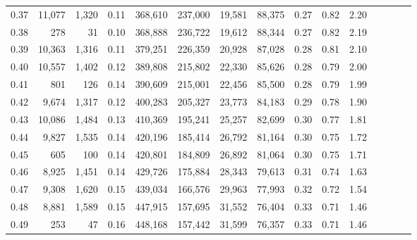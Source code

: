 \begin{tabular}{rrrcrrrrrrrrrrr}
0.37 &  11,077 &   1,320 &                                       0.11 &  368,610 &  237,000 &   19,581 &   88,375 &  0.27 &  0.82 &                         2.20 \\
0.38 &     278 &      31 &                                       0.10 &  368,888 &  236,722 &   19,612 &   88,344 &  0.27 &  0.82 &                         2.19 \\
0.39 &  10,363 &   1,316 &                                       0.11 &  379,251 &  226,359 &   20,928 &   87,028 &  0.28 &  0.81 &                         2.10 \\
0.40 &  10,557 &   1,402 &                                       0.12 &  389,808 &  215,802 &   22,330 &   85,626 &  0.28 &  0.79 &                         2.00 \\
0.41 &     801 &     126 &                                       0.14 &  390,609 &  215,001 &   22,456 &   85,500 &  0.28 &  0.79 &                         1.99 \\
0.42 &   9,674 &   1,317 &                                       0.12 &  400,283 &  205,327 &   23,773 &   84,183 &  0.29 &  0.78 &                         1.90 \\
0.43 &  10,086 &   1,484 &                                       0.13 &  410,369 &  195,241 &   25,257 &   82,699 &  0.30 &  0.77 &                         1.81 \\
0.44 &   9,827 &   1,535 &                                       0.14 &  420,196 &  185,414 &   26,792 &   81,164 &  0.30 &  0.75 &                         1.72 \\
0.45 &     605 &     100 &                                       0.14 &  420,801 &  184,809 &   26,892 &   81,064 &  0.30 &  0.75 &                         1.71 \\
0.46 &   8,925 &   1,451 &                                       0.14 &  429,726 &  175,884 &   28,343 &   79,613 &  0.31 &  0.74 &                         1.63 \\
0.47 &   9,308 &   1,620 &                                       0.15 &  439,034 &  166,576 &   29,963 &   77,993 &  0.32 &  0.72 &                         1.54 \\
0.48 &   8,881 &   1,589 &                                       0.15 &  447,915 &  157,695 &   31,552 &   76,404 &  0.33 &  0.71 &                         1.46 \\
0.49 &     253 &      47 &                                       0.16 &  448,168 &  157,442 &   31,599 &   76,357 &  0.33 &  0.71 &                         1.46 \\

\end{tabular}
